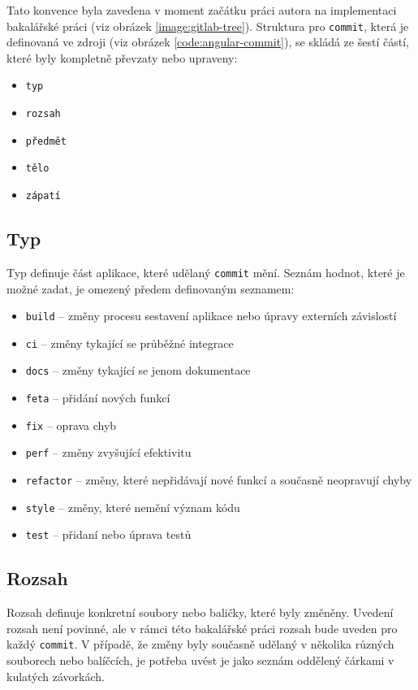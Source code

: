     Tato konvence byla zavedena v moment začátku práci autora na implementaci bakalářské práci (viz obrázek \ref{image:gitlab-tree}). Struktura pro \verb|commit|, která je definovaná ve zdroji (viz obrázek \ref{code:angular-commit}), se skládá ze šestí částí, které byly kompletně převzaty nebo upraveny:
    \begin{itemize}
        \item \texttt{typ}
        \item \texttt{rozsah}
        \item \texttt{předmět}
        \item \texttt{tělo}
        \item \texttt{zápatí}
    \end{itemize}
    
    \subsection{Typ}
        Typ definuje část aplikace, které udělaný \verb|commit| mění. Seznám hodnot, které je možné zadat, je omezený předem definovaným seznamem:
        \begin{itemize}
            \item \texttt{build} -- změny procesu sestavení aplikace nebo úpravy externích závislostí
            \item \texttt{ci} -- změny tykající se průběžné integrace
            \item \texttt{docs} -- změny tykající se jenom dokumentace
            \item \texttt{feta} -- přidání nových funkcí
            \item \texttt{fix} -- oprava chyb
            \item \texttt{perf} -- změny zvyšující efektivitu
            \item \texttt{refactor} -- změny, které nepřidávají nové funkcí a současně neopravují chyby
            \item \texttt{style} -- změny, které nemění význam kódu
            \item \texttt{test} -- přidaní nebo úprava testů
        \end{itemize}
    
    \subsection{Rozsah}
        Rozsah definuje konkretní soubory nebo baličky, které byly změněny. Uvedení rozsah není povinné, ale v rámci této bakalářské práci rozsah bude uveden pro každý \verb|commit|. V případě, že změny byly současně udělaný v několika různých souborech nebo balíčcích, je potřeba uvést je jako seznám oddělený čárkami v kulatých závorkách.
    
